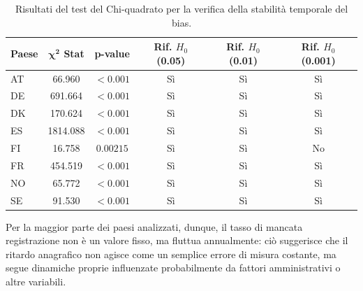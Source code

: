 \begin{table}[H]
    \centering
    \begin{tabular}{l c c c c c}
        \hline
        \textbf{Paese} & $\boldsymbol{\chi^2}$ \textbf{Stat} & \textbf{p-value} & \textbf{Rif. $H_0$ (0.05)} & \textbf{Rif. $H_0$ (0.01)} & \textbf{Rif. $H_0$ (0.001)} \\
        \hline
        AT             & 66.960                              & $<0.001$         & Sì                         & Sì                         & Sì                          \\
        DE             & 691.664                             & $<0.001$         & Sì                         & Sì                         & Sì                          \\
        DK             & 170.624                             & $<0.001$         & Sì                         & Sì                         & Sì                          \\
        ES             & 1814.088                            & $<0.001$         & Sì                         & Sì                         & Sì                          \\
        FI             & 16.758                              & $0.00215$        & Sì                         & Sì                         & No                          \\
        FR             & 454.519                             & $<0.001$         & Sì                         & Sì                         & Sì                          \\
        NO             & 65.772                              & $<0.001$         & Sì                         & Sì                         & Sì                          \\
        SE             & 91.530                              & $<0.001$         & Sì                         & Sì                         & Sì                          \\
        \hline
    \end{tabular}
    \caption{Risultati del test del Chi-quadrato per la verifica della stabilità temporale del bias.}
    \label{tab:chi2}
\end{table}

Per la maggior parte dei paesi analizzati, dunque, il tasso di mancata registrazione non è un valore fisso, ma fluttua annualmente: ciò suggerisce che il ritardo anagrafico non agisce come un semplice errore di misura costante, ma segue dinamiche proprie influenzate probabilmente da fattori amministrativi o altre variabili.

